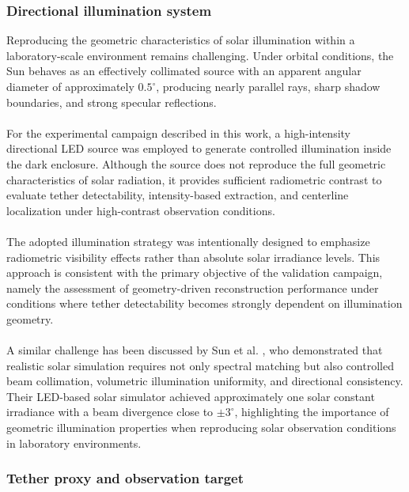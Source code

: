 \subsubsection{Directional illumination system}

Reproducing the geometric characteristics of solar illumination within a laboratory-scale environment remains challenging. Under orbital conditions, the Sun behaves as an effectively collimated source with an apparent angular diameter of approximately $0.5^\circ$, producing nearly parallel rays, sharp shadow boundaries, and strong specular reflections.
\\\\
For the experimental campaign described in this work, a high-intensity directional LED source was employed to generate controlled illumination inside the dark enclosure. Although the source does not reproduce the full geometric characteristics of solar radiation, it provides sufficient radiometric contrast to evaluate tether detectability, intensity-based extraction, and centerline localization under high-contrast observation conditions.
\\\\
The adopted illumination strategy was intentionally designed to emphasize radiometric visibility effects rather than absolute solar irradiance levels. This approach is consistent with the primary objective of the validation campaign, namely the assessment of geometry-driven reconstruction performance under conditions where tether detectability becomes strongly dependent on illumination geometry.
\\\\
A similar challenge has been discussed by Sun et al. \cite{sun2022led}, who demonstrated that realistic solar simulation requires not only spectral matching but also controlled beam collimation, volumetric illumination uniformity, and directional consistency. Their LED-based solar simulator achieved approximately one solar constant irradiance with a beam divergence close to $\pm 3^\circ$, highlighting the importance of geometric illumination properties when reproducing solar observation conditions in laboratory environments.

\subsubsection{Tether proxy and observation target}

